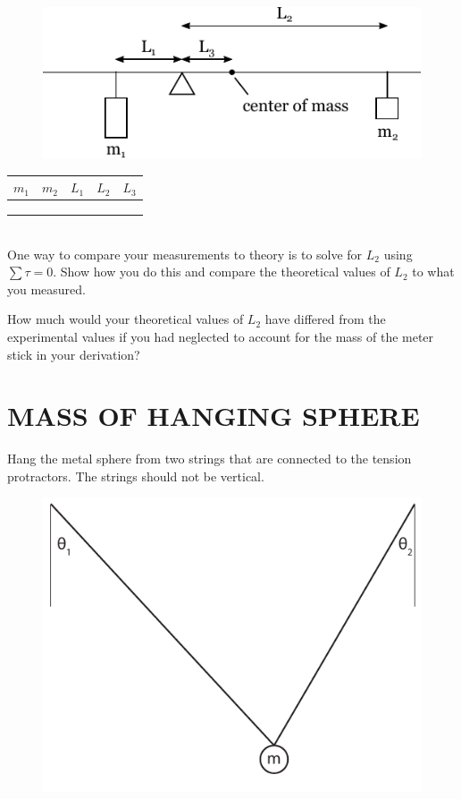 \documentclass[11pt,letterpaper]{article}
\begin{document}
\begin{figure}[h]
\begin{center}
\includegraphics{./lab6_part2b.pdf}
\end{center}
\end{figure}

\begin{tabularx}{\linewidth}{|Y|Y|Y|Y|Y|}
\hline
$m_1$ & $m_2$ & $L_1$ & $L_2$ & $L_3$\\
\hline &&&&\\
\hline &&&&\\
\hline &&&&\\
\hline
\end{tabularx}\\

One way to compare your measurements to theory is to solve for $L_2$ using $\sum\tau=0$. Show how you do this and compare the theoretical values of $L_2$ to what you measured.

How much would your theoretical values of $L_2$ have differed from the experimental values if you had neglected to account for the mass of the meter stick in your derivation?

\section{MASS OF HANGING SPHERE}
Hang the metal sphere from two strings that are connected to the tension protractors. The strings should not be vertical.
\begin{figure}[h]
  \begin{center}
    \includegraphics[]{./hanging_mass.pdf}
  \end{center}
\end{figure}
\end{document}
